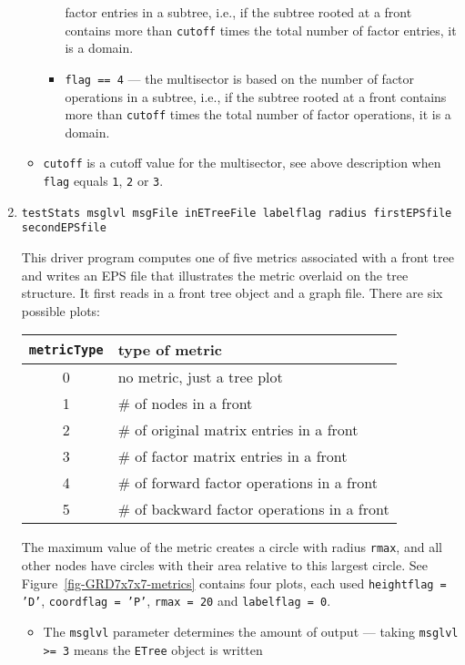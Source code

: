 \begin{enumerate}
\begin{itemize}
\begin{itemize}
factor entries in a subtree, i.e., if the subtree rooted at a front
contains more than {\tt cutoff} times the total number of factor
entries, it is a domain.
\item
{\tt flag == 4} --- the multisector is based on the number of
factor operations in a subtree, i.e., if the subtree rooted at a front
contains more than {\tt cutoff} times the total number of factor
operations, it is a domain.
\end{itemize}
\item
{\tt cutoff} is a cutoff value for the multisector, see above
description when {\tt flag} equals {\tt 1}, {\tt 2} or {\tt 3}.
\end{itemize}
\item
\begin{verbatim}
testStats msglvl msgFile inETreeFile labelflag radius firstEPSfile secondEPSfile
\end{verbatim}
This driver program computes one of five metrics associated with a
front tree and writes an EPS file that illustrates the metric overlaid
on the tree structure.
It first reads in a front tree object and 
a graph file.
There are six possible plots:
\begin{center}
\begin{tabular}{c|l}
{\tt metricType} & type of metric \\ \hline
0 & no metric, just a tree plot \\
1 & \# of nodes in a front \\
2 & \# of original matrix entries in a front \\
3 & \# of factor matrix entries in a front \\
4 & \# of forward factor operations in a front \\
5 & \# of backward factor operations in a front 
\end{tabular}
\end{center}
The maximum value of the metric creates a circle with radius
{\tt rmax}, and all other nodes have circles with their area
relative to this largest circle.
See Figure~\ref{fig-GRD7x7x7-metrics} contains four plots,
each used {\tt heightflag = 'D'}, {\tt coordflag = 'P'},
{\tt rmax = 20} and {\tt labelflag = 0}.
\par
\begin{itemize}
\item
The {\tt msglvl} parameter determines the amount of output ---
taking {\tt msglvl >= 3} means the {\tt ETree} object is written

\end{itemize}
\end{enumerate}
